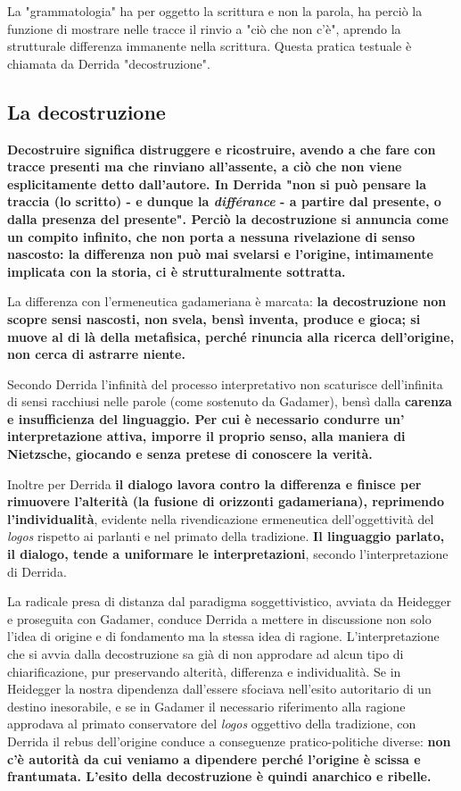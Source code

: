 La "grammatologia" ha per oggetto la scrittura e
non la parola, ha perciò la funzione di
mostrare nelle tracce il rinvio a "ciò che non
c'è", aprendo la strutturale differenza immanente
nella scrittura. Questa pratica testuale è
chiamata da Derrida "decostruzione".

\subsection{La decostruzione}

\textbf{Decostruire significa distruggere e ricostruire,
avendo a che fare con tracce presenti ma che rinviano
all'assente, a ciò che non viene esplicitamente
detto dall'autore.
In Derrida "non si può pensare la traccia (lo scritto) - e dunque la \textit{différance} - a partire dal presente, o dalla presenza del presente". Perciò la decostruzione
si annuncia come un compito infinito, che non porta
a nessuna rivelazione di senso nascosto: la differenza
non può mai svelarsi e l'origine, intimamente
implicata con la storia, ci è strutturalmente sottratta.}

La differenza con l'ermeneutica gadameriana è
marcata: \textbf{la decostruzione non scopre sensi nascosti,
non svela, bensì inventa, produce e gioca; si muove al di là della metafisica, perché
rinuncia alla ricerca dell'origine, non cerca di astrarre niente.}

Secondo Derrida l'infinità del processo interpretativo non scaturisce dell'infinita di sensi racchiusi
nelle parole (come sostenuto da Gadamer), bensì dalla \textbf{carenza e
insufficienza del linguaggio. Per cui è necessario 
condurre un' interpretazione attiva, imporre il
proprio senso, alla maniera di Nietzsche,
giocando e senza pretese di conoscere la verità.}

Inoltre per Derrida\textbf{ il dialogo lavora contro la
differenza e finisce per rimuovere l'alterità
(la fusione di orizzonti gadameriana), reprimendo
l'individualità}, evidente nella rivendicazione
ermeneutica dell'oggettività del \textit{logos}
rispetto ai parlanti e nel primato della tradizione. \textbf{Il linguaggio parlato, il dialogo, tende a uniformare le interpretazioni}, secondo l'interpretazione di Derrida.

La radicale presa di distanza dal paradigma
soggettivistico, avviata da Heidegger e proseguita
con Gadamer, conduce Derrida a mettere in
discussione non solo l'idea di origine e di fondamento ma la stessa idea di ragione.
L'interpretazione che si avvia dalla decostruzione sa già di non approdare ad alcun
tipo di chiarificazione, pur preservando alterità,
differenza e individualità.
Se in Heidegger la nostra dipendenza dall'essere
sfociava nell'esito autoritario di un destino
inesorabile, e se in Gadamer il necessario riferimento
alla ragione approdava al primato conservatore
del \textit{logos} oggettivo della tradizione, con Derrida
il rebus dell'origine conduce a conseguenze
pratico-politiche diverse: \textbf{non c'è autorità
da cui veniamo a dipendere perché l'origine
è scissa e frantumata. L'esito della decostruzione è quindi anarchico e ribelle.}

